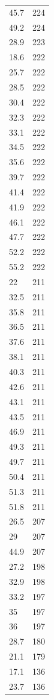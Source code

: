 \begin{table}[ht]
\begin{tabular}{lr}
  45.7 & 224 \\ 
  49.2 & 224 \\ 
  28.9 & 223 \\ 
  18.6 & 222 \\ 
  25.7 & 222 \\ 
  28.5 & 222 \\ 
  30.4 & 222 \\ 
  32.3 & 222 \\ 
  33.1 & 222 \\ 
  34.5 & 222 \\ 
  35.6 & 222 \\ 
  39.7 & 222 \\ 
  41.4 & 222 \\ 
  41.9 & 222 \\ 
  46.1 & 222 \\ 
  47.7 & 222 \\ 
  52.2 & 222 \\ 
  55.2 & 222 \\ 
  22 & 211 \\ 
  32.5 & 211 \\ 
  35.8 & 211 \\ 
  36.5 & 211 \\ 
  37.6 & 211 \\ 
  38.1 & 211 \\ 
  40.3 & 211 \\ 
  42.6 & 211 \\ 
  43.1 & 211 \\ 
  43.5 & 211 \\ 
  46.9 & 211 \\ 
  49.3 & 211 \\ 
  49.7 & 211 \\ 
  50.4 & 211 \\ 
  51.3 & 211 \\ 
  51.8 & 211 \\ 
  26.5 & 207 \\ 
  29 & 207 \\ 
  44.9 & 207 \\ 
  27.2 & 198 \\ 
  32.9 & 198 \\ 
  33.2 & 197 \\ 
  35 & 197 \\ 
  36 & 197 \\ 
  28.7 & 180 \\ 
  21.1 & 179 \\ 
  17.1 & 136 \\ 
  23.7 & 136 \\ 

\end{tabular}
\end{table}
